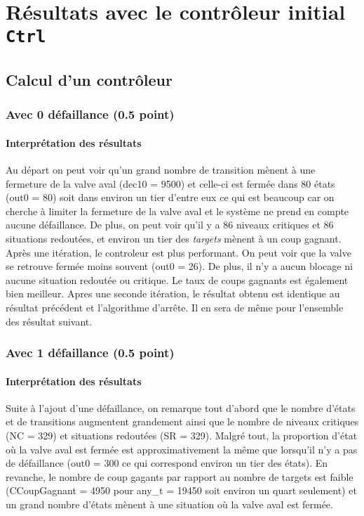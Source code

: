 \documentclass[a4paper]{book}
\begin{document}
\section{Résultats avec le contrôleur initial {\tt Ctrl}}
\subsection{Calcul d'un contrôleur}
\subsubsection{Avec 0 défaillance (0.5 point)}



%
%
\paragraph{Interprétation des résultats}
Au départ on peut voir qu'un grand nombre de transition mènent à une fermeture de la valve aval (dec10 = 9500) et celle-ci est fermée dans 80 états (out0 = 80) soit dans environ un tier d'entre eux ce qui est beaucoup car on cherche à limiter la fermeture de la valve aval et le système ne prend en compte aucune défaillance. De plus, on peut voir qu'il y a 86 niveaux critiques et 86 situations redoutées, et environ un tier des \textit{targets} mènent à un coup gagnant.
Après une itération, le controleur est plus performant. On peut voir que la valve se retrouve fermée moins souvent (out0 = 26). De plus, il n'y a aucun blocage ni aucune situation redoutée ou critique. Le taux de coups gagnants est également bien meilleur.
Apres une seconde itération, le résultat obtenu est identique au résultat précédent et l'algorithme d'arrête. Il en sera de même pour l'ensemble des résultat suivant.


\subsubsection{Avec 1 défaillance (0.5 point)}




%
\paragraph{Interprétation des résultats}
Suite à l'ajout d'une défaillance, on remarque tout d'abord que le nombre d'états et de transitions augmentent grandement ainsi que le nombre de niveaux critiques (NC = 329) et situations redoutées (SR = 329). Malgré tout, la proportion d'état où la valve aval est fermée est approximativement la même que lorsqu'il n'y a pas de défaillance (out0 = 300 ce qui correspond environ un tier des états). En revanche, le nombre de coup gagants par rapport au nombre de targets est faible (CCoupGagnant = 4950 pour any_t = 19450 soit environ un quart seulement) et un grand nombre d'états mènent à une situation où la valve aval est fermée.
\end{document}
